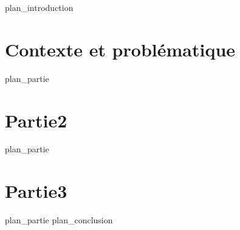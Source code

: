 \label{part:int}
{plan_introduction}
\part{Contexte et problématique}
\label{part:01}
{plan_partie}
\part{Partie2}
\label{part:02}
{plan_partie}
\part{Partie3}
\label{part:03}
{plan_partie}
\label{part:cnl}
{plan_conclusion}
